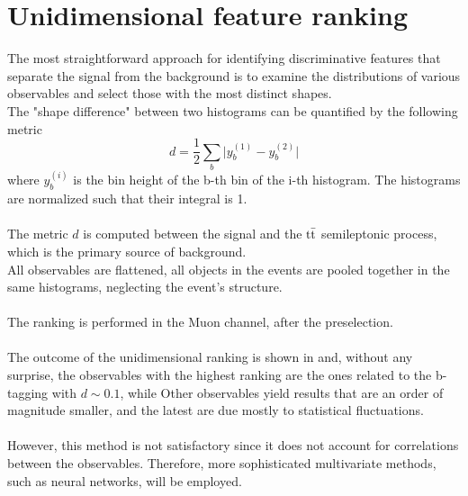 \begin{minipage}[H]{\linewidth}
\begin{minipage}{0.62\linewidth}
\section{Unidimensional feature ranking}
The most straightforward approach for identifying discriminative features that separate the signal from the background is to examine the distributions of various observables and select those with the most distinct shapes.\\
The "shape difference" between two histograms can be quantified by the following metric
\begin{equation}
    d=\frac{1}{2}\sum_b \bigg| y_b^{(1)}-y_b^{(2)} \bigg|
\end{equation}
where $y_b^{(i)}$ is the bin height of the b-th bin of the i-th histogram. The histograms are normalized such that their integral is 1.\\
\\
The metric $d$ is computed between the signal and the ${{\text{t}}{\bar{\text{t}}}}$ semileptonic process, which is the primary source of background.\\
All observables are flattened, \ie all objects in the events are pooled together in the same histograms, neglecting the event's structure.\\
\\
The ranking is performed in the Muon channel, after the preselection.\\\\
The outcome of the unidimensional ranking is shown in  and, without any surprise, the observables with the highest ranking are the ones related to the b-tagging with $d\sim 0.1$, while Other observables yield results that are an order of magnitude smaller, and the latest are due mostly to statistical fluctuations.\\
\\
However, this method is not satisfactory since it does not account for correlations between the observables. Therefore, more sophisticated multivariate methods, such as neural networks, will be employed.\\\\\\\\\\    
\end{minipage}
\end{minipage}
